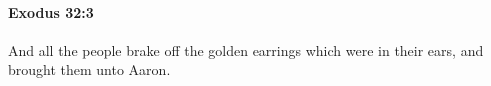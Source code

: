 
		\paragraph{Exodus 32:3} %
			\label{EXODUS-32-3}

			And all the people brake off the golden earrings which were in their ears, and brought them unto Aaron.


